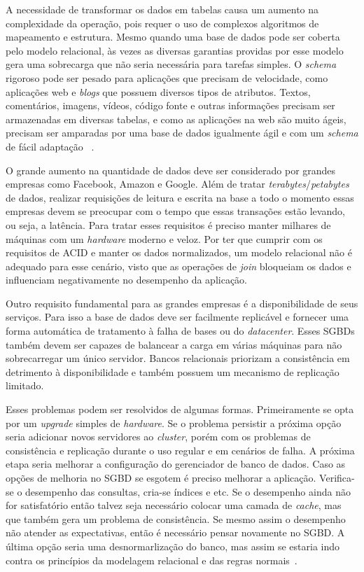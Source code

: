 A necessidade de transformar os dados em tabelas causa um aumento na complexidade da operação, pois requer o uso de complexos algoritmos de mapeamento e estrutura. Mesmo quando uma base de dados pode ser coberta pelo modelo relacional, às vezes as diversas garantias providas por esse modelo gera uma sobrecarga que não seria necessária para tarefas simples. O \textit{schema} rigoroso pode ser pesado para aplicações que precisam de velocidade, como aplicações web e \textit{blogs} que possuem diversos tipos de atributos. Textos, comentários, imagens, vídeos, código fonte e outras informações precisam ser armazenadas em diversas tabelas, e como as aplicações na web são muito ágeis, precisam ser amparadas por uma base de dados igualmente ágil e com um \textit{schema} de fácil adaptação ~\cite{nosqlevaluation}.

O grande aumento na quantidade de dados deve ser considerado por grandes empresas como Facebook, Amazon e Google. Além de tratar \textit{terabytes}/\textit{petabytes} de dados, realizar requisições de leitura e escrita na base a todo o momento essas empresas devem se preocupar com o tempo que essas transações estão levando, ou seja, a latência. Para tratar esses requisitos é preciso manter milhares de máquinas com um \textit{hardware} moderno e veloz. Por ter que cumprir com os requisitos de ACID e manter os dados normalizados, um modelo relacional não é adequado para esse cenário, visto que as operações de \textit{join} bloqueiam os dados e influenciam negativamente no desempenho da aplicação.

Outro requisito fundamental para as grandes empresas é a disponibilidade de seus serviços. Para isso a base de dados deve ser facilmente replicável e fornecer uma forma automática de tratamento à falha de bases ou do \textit{datacenter}. Esses SGBDs também devem ser capazes de balancear a carga em várias máquinas para não sobrecarregar um único servidor. Bancos relacionais priorizam a consistência em detrimento à disponibilidade e também possuem um mecanismo de replicação limitado.

Esses problemas podem ser resolvidos de algumas formas. Primeiramente se opta por um \textit{upgrade} simples de \textit{hardware}. Se o problema persistir a próxima opção seria adicionar novos servidores ao \textit{cluster}, porém com os problemas de consistência e replicação durante o uso regular e em cenários de falha. A próxima etapa seria melhorar a configuração do gerenciador de banco de dados. Caso as opções de melhoria no SGBD se esgotem é preciso melhorar a aplicação. Verifica-se o desempenho das consultas, cria-se índices e etc. Se o desempenho ainda não for satisfatório então talvez seja necessário colocar uma camada de \textit{cache}, mas que também gera um problema de consistência. Se mesmo assim o desempenho não atender as expectativas, então é necessário pensar novamente no SGBD. A última opção seria uma desnormarlização do banco, mas assim se estaria indo contra os princípios da modelagem relacional e das regras normais~\cite{cassandraguide}.

